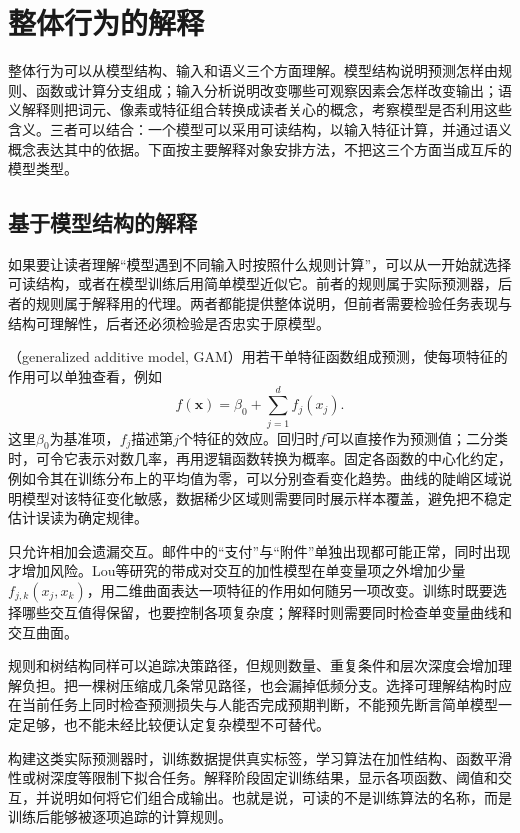 \section{整体行为的解释}
\label{sec:interpretability-global}

整体行为可以从模型结构、输入和语义三个方面理解。模型结构说明预测怎样由规则、函数或计算分支组成；输入分析说明改变哪些可观察因素会怎样改变输出；语义解释则把词元、像素或特征组合转换成读者关心的概念，考察模型是否利用这些含义。三者可以结合：一个模型可以采用可读结构，以输入特征计算，并通过语义概念表达其中的依据。下面按主要解释对象安排方法，不把这三个方面当成互斥的模型类型。

\subsection{基于模型结构的解释}
\label{sec:interpretability-global-response}

如果要让读者理解“模型遇到不同输入时按照什么规则计算”，可以从一开始就选择可读结构，或者在模型训练后用简单模型近似它。前者的规则属于实际预测器，后者的规则属于解释用的代理。两者都能提供整体说明，但前者需要检验任务表现与结构可理解性，后者还必须检验是否忠实于原模型。

（generalized additive model, GAM）用若干单特征函数组成预测，使每项特征的作用可以单独查看，例如
\begin{equation}
 f(\bm{x})=\beta_0+\sum_{j=1}^{d}f_j(x_j).
 \label{eq:interpretability-gam}
\end{equation}
这里$\beta_0$为基准项，$f_j$描述第$j$个特征的效应。回归时$f$可以直接作为预测值；二分类时，可令它表示对数几率，再用逻辑函数转换为概率。固定各函数的中心化约定，例如令其在训练分布上的平均值为零，可以分别查看变化趋势。曲线的陡峭区域说明模型对该特征变化敏感，数据稀少区域则需要同时展示样本覆盖，避免把不稳定估计误读为确定规律。

只允许相加会遗漏交互。邮件中的“支付”与“附件”单独出现都可能正常，同时出现才增加风险。Lou等研究的带成对交互的加性模型在单变量项之外增加少量$f_{j,k}(x_j,x_k)$，用二维曲面表达一项特征的作用如何随另一项改变。训练时既要选择哪些交互值得保留，也要控制各项复杂度；解释时则需要同时检查单变量曲线和交互曲面。

规则和树结构同样可以追踪决策路径，但规则数量、重复条件和层次深度会增加理解负担。把一棵树压缩成几条常见路径，也会漏掉低频分支。选择可理解结构时应在当前任务上同时检查预测损失与人能否完成预期判断，不能预先断言简单模型一定足够，也不能未经比较便认定复杂模型不可替代。

构建这类实际预测器时，训练数据提供真实标签，学习算法在加性结构、函数平滑性或树深度等限制下拟合任务。解释阶段固定训练结果，显示各项函数、阈值和交互，并说明如何将它们组合成输出。也就是说，可读的不是训练算法的名称，而是训练后能够被逐项追踪的计算规则。

